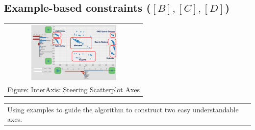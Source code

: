 \documentclass[portrait,final,a0paper]{nadiposter}
\begin{document}
\begin{poster}
{\begin{multicols}{3}
    \section*{\normalsize{Example-based constraints ($[B],[C],[D]$})}
    \begin{center}
        \begin{tabular}{c}
            \includegraphics[height=8em]{poster_NADI_2018/images/eg_interaxis.png}\\
            \scriptsize{Figure: InterAxis: Steering Scatterplot Axes \cite{Kim2016InterAxis}}
        \end{tabular}
        \begin{tabular}{p{13em}}
            \quad Using examples to guide the algorithm to construct two easy understandable axes.
        \end{tabular}
    \end{center}
\end{multicols}
}

\end{poster}
\end{document}
